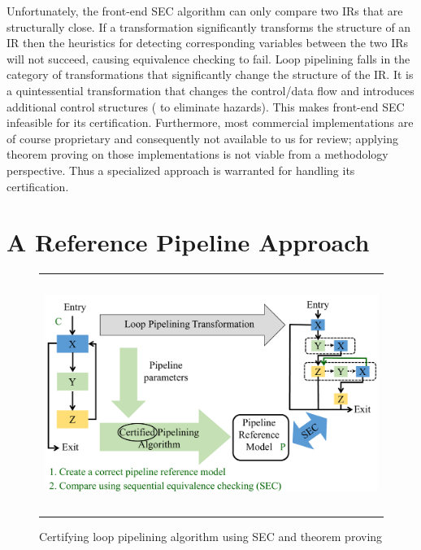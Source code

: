  Unfortunately, the front-end SEC
algorithm can only compare two IRs that are structurally close.  If a
transformation significantly transforms the structure of an IR then
the heuristics for detecting corresponding variables between the two
IRs will not succeed, causing equivalence checking to fail.
Loop pipelining falls in the category of
transformations that significantly change the structure of the IR.
It is a quintessential transformation that changes the control/data
flow and introduces additional control structures (%
to eliminate
hazards).  This makes front-end SEC infeasible for its certification.
Furthermore, most commercial implementations are of course
proprietary and consequently not available to us for review; applying
theorem proving on those implementations is not viable from a
methodology perspective.  Thus a specialized approach is warranted for
handling its certification.

\section{A Reference Pipeline Approach}
\label{subsec:reference-pipeline}

\begin{figure}[t!]
\begin{center}
\begin{tabular}{c}
\includegraphics[height=3in]{fig-proposal/ref-pipeline-approach}
\end{tabular}
\end{center}
\caption{Certifying loop pipelining algorithm using SEC and theorem proving}
\label{fig:ref-pipeline-approach}
\end{figure}

